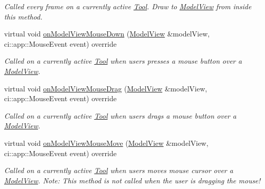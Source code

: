 \begin{DoxyCompactItemize}
\begin{DoxyCompactList}\small\item\em Called every frame on a currently active \mbox{\hyperlink{classpepr3d_1_1_tool}{Tool}}. Draw to \mbox{\hyperlink{classpepr3d_1_1_model_view}{Model\+View}} from inside this method. \end{DoxyCompactList}\item 
\mbox{\label{classpepr3d_1_1_paint_bucket_af0204c28c5e9f6ec4a244ab0e9105ef6}} 
virtual void \mbox{\hyperlink{classpepr3d_1_1_paint_bucket_af0204c28c5e9f6ec4a244ab0e9105ef6}{on\+Model\+View\+Mouse\+Down}} (\mbox{\hyperlink{classpepr3d_1_1_model_view}{Model\+View}} \&model\+View, ci\+::app\+::\+Mouse\+Event event) override
\begin{DoxyCompactList}\small\item\em Called on a currently active \mbox{\hyperlink{classpepr3d_1_1_tool}{Tool}} when users presses a mouse button over a \mbox{\hyperlink{classpepr3d_1_1_model_view}{Model\+View}}. \end{DoxyCompactList}\item 
\mbox{\label{classpepr3d_1_1_paint_bucket_a64f3acef2f66ba3c5b323267aeadd98d}} 
virtual void \mbox{\hyperlink{classpepr3d_1_1_paint_bucket_a64f3acef2f66ba3c5b323267aeadd98d}{on\+Model\+View\+Mouse\+Drag}} (\mbox{\hyperlink{classpepr3d_1_1_model_view}{Model\+View}} \&model\+View, ci\+::app\+::\+Mouse\+Event event) override
\begin{DoxyCompactList}\small\item\em Called on a currently active \mbox{\hyperlink{classpepr3d_1_1_tool}{Tool}} when users drags a mouse button over a \mbox{\hyperlink{classpepr3d_1_1_model_view}{Model\+View}}. \end{DoxyCompactList}\item 
\mbox{\label{classpepr3d_1_1_paint_bucket_a4e667f3a895759cd6807241a378a6615}} 
virtual void \mbox{\hyperlink{classpepr3d_1_1_paint_bucket_a4e667f3a895759cd6807241a378a6615}{on\+Model\+View\+Mouse\+Move}} (\mbox{\hyperlink{classpepr3d_1_1_model_view}{Model\+View}} \&model\+View, ci\+::app\+::\+Mouse\+Event event) override
\begin{DoxyCompactList}\small\item\em Called on a currently active \mbox{\hyperlink{classpepr3d_1_1_tool}{Tool}} when users moves mouse cursor over a \mbox{\hyperlink{classpepr3d_1_1_model_view}{Model\+View}}. Note\+: This method is not called when the user is dragging the mouse! \end{DoxyCompactList}\item 

\end{DoxyCompactItemize}
